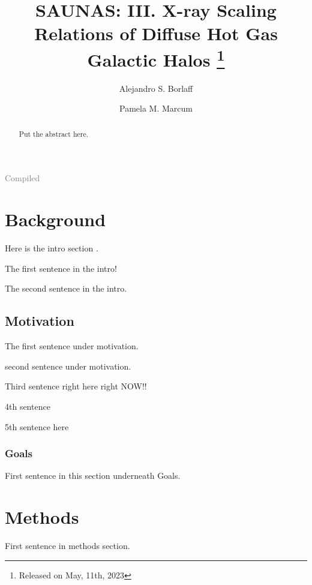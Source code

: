 \documentclass[modern]{aastex631}
\begin{document}
\vspace{-3.5cm}\textcolor{gray}{Compiled \CurrentLocaleTime\ \CurrentLocaleDate\  \CurrentLocaleRegionNativeName}

\title{\textbf{SAUNAS}: III. X-ray Scaling Relations of Diffuse Hot Gas Galactic Halos \footnote{Released on May, 11th, 2023}}
\author{Alejandro S. Borlaff}
\author{Pamela M. Marcum}

\begin{abstract}
Put the abstract here. 
\end{abstract}

\section{Background}
Here is the intro section \citep{aguerri+1998aj116_2136, bell+2006apj640_241,bell+2006apj652_270}. 

The first sentence in the intro! 

The second sentence in the intro. 

\subsection{Motivation}

The first sentence under motivation.

second sentence under motivation.

Third sentence right here right NOW!! 

4th sentence 

5th sentence here 

\subsubsection{Goals}
First sentence in this section underneath Goals. 

\section{Methods}
First sentence in methods section. 

\begin{acknowledgements}

\end{acknowledgements}
\vspace{5mm}


% 
 

\end{document}
